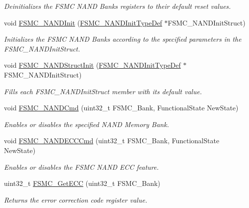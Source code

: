 \begin{DoxyCompactItemize}
\begin{DoxyCompactList}\small\item\em Deinitializes the F\-S\-M\-C N\-A\-N\-D Banks registers to their default reset values. \end{DoxyCompactList}\item 
void \hyperlink{group___f_s_m_c_ga9f81ccc4e126c11f1eb33077b1a68e6f}{F\-S\-M\-C\-\_\-\-N\-A\-N\-D\-Init} (\hyperlink{struct_f_s_m_c___n_a_n_d_init_type_def}{F\-S\-M\-C\-\_\-\-N\-A\-N\-D\-Init\-Type\-Def} $\ast$F\-S\-M\-C\-\_\-\-N\-A\-N\-D\-Init\-Struct)
\begin{DoxyCompactList}\small\item\em Initializes the F\-S\-M\-C N\-A\-N\-D Banks according to the specified parameters in the F\-S\-M\-C\-\_\-\-N\-A\-N\-D\-Init\-Struct. \end{DoxyCompactList}\item 
void \hyperlink{group___f_s_m_c_ga8283ad94ad8e83d49d5b77d1c7e17862}{F\-S\-M\-C\-\_\-\-N\-A\-N\-D\-Struct\-Init} (\hyperlink{struct_f_s_m_c___n_a_n_d_init_type_def}{F\-S\-M\-C\-\_\-\-N\-A\-N\-D\-Init\-Type\-Def} $\ast$F\-S\-M\-C\-\_\-\-N\-A\-N\-D\-Init\-Struct)
\begin{DoxyCompactList}\small\item\em Fills each F\-S\-M\-C\-\_\-\-N\-A\-N\-D\-Init\-Struct member with its default value. \end{DoxyCompactList}\item 
void \hyperlink{group___f_s_m_c_ga33ec7c39ea4d42e92c72c6e517d8235c}{F\-S\-M\-C\-\_\-\-N\-A\-N\-D\-Cmd} (uint32\-\_\-t F\-S\-M\-C\-\_\-\-Bank, Functional\-State New\-State)
\begin{DoxyCompactList}\small\item\em Enables or disables the specified N\-A\-N\-D Memory Bank. \end{DoxyCompactList}\item 
void \hyperlink{group___f_s_m_c_ga5800301fc39bbe998a18ebd9ff191cdc}{F\-S\-M\-C\-\_\-\-N\-A\-N\-D\-E\-C\-C\-Cmd} (uint32\-\_\-t F\-S\-M\-C\-\_\-\-Bank, Functional\-State New\-State)
\begin{DoxyCompactList}\small\item\em Enables or disables the F\-S\-M\-C N\-A\-N\-D E\-C\-C feature. \end{DoxyCompactList}\item 
uint32\-\_\-t \hyperlink{group___f_s_m_c_gaad6d4f5b5a41684ce053fea55bdb98d8}{F\-S\-M\-C\-\_\-\-Get\-E\-C\-C} (uint32\-\_\-t F\-S\-M\-C\-\_\-\-Bank)
\begin{DoxyCompactList}\small\item\em Returns the error correction code register value. \end{DoxyCompactList}\item 

\end{DoxyCompactItemize}
